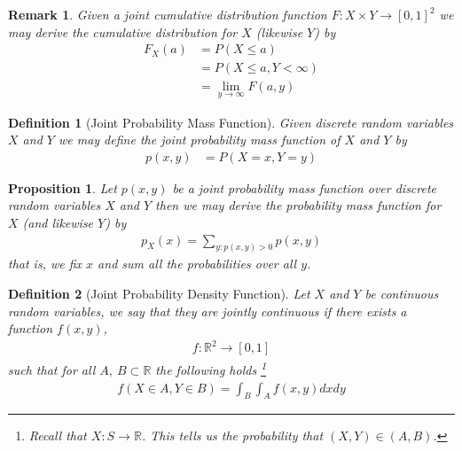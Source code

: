 \documentclass[11pt, oneside]{book}   	%
\newtheorem{definition}{Definition}[chapter]
\newtheorem{remark}{Remark}[chapter]
\newtheorem{proposition}{Proposition}[chapter]
\newcommand{\paren}[1]{\left(#1\right)}
\begin{document}
\begin{spacing}{1.618}
\begin{remark}
	Given a joint cumulative distribution function $F:X\times Y\to [0,1]^2$ we may derive the cumulative distribution for $X$ (likewise $Y$) by 
	\begin{alignat}{4}
		F_X(a)&=P\paren{X\leq a} \\
			&=P\paren{X\leq a, Y<\infty} \\
			&=\lim_{y\to\infty}F(a, y)
	\end{alignat}
\end{remark}

\begin{definition}[Joint Probability Mass Function]
	Given discrete random variables $X$ and $Y$ we may define the \emph{joint probability mass function} of $X$ and $Y$ by 
	\begin{alignat}{4}
		p(x, y)&=P\paren{X=x, Y=y}
	\end{alignat}
\end{definition}

\begin{proposition}
	Let $p(x, y)$ be a joint probability mass function over discrete random variables $X$ and $Y$ then we may derive the probability mass function for $X$ (and likewise $Y$) by 
	\begin{alignat}{4}
		p_X(x)=\sum_{y:p(x, y)>0} p(x, y)
	\end{alignat}
	that is, we fix $x$ and sum all the probabilities over all $y$. 
\end{proposition}

\begin{definition}[Joint Probability Density Function]
	Let $X$ and $Y$ be continuous random variables, we say that they are \emph{jointly continuous} if there exists a function $f(x, y)$,
	\begin{alignat}{4}
		f:\mathbb{R}^2\to [0,1]
	\end{alignat}
	such that for all $A,~B\subset \mathbb{R}$ the following holds \footnote{Recall that $X:S\to \mathbb{R}$. This tells us the probability that $(X, Y)\in (A, B)$.}
	\begin{alignat}{4}
		f\paren{X\in A, Y\in B}=\int_B\int_Af(x, y)dx dy
	\end{alignat}
\end{definition}
\end{spacing}
\end{document}
